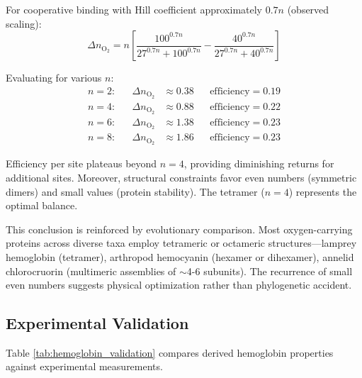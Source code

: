 \documentclass[10pt,twocolumn,a4paper]{article}
\theoremstyle{remark}
\begin{document}
For cooperative binding with Hill coefficient approximately $0.7n$ (observed scaling):
\begin{equation}
\Delta n_{\mathrm{O}_{2}} = n\left[\frac{100^{0.7n}}{27^{0.7n} + 100^{0.7n}} - \frac{40^{0.7n}}{27^{0.7n} + 40^{0.7n}}\right]
\end{equation}

Evaluating for various $n$:
\begin{align}
n = 2: &&\Delta n_{\mathrm{O}_{2}} &\approx 0.38 &&\text{efficiency} = 0.19 \\
n = 4: &&\Delta n_{\mathrm{O}_{2}} &\approx 0.88 &&\text{efficiency} = 0.22 \\
n = 6: &&\Delta n_{\mathrm{O}_{2}} &\approx 1.38 &&\text{efficiency} = 0.23 \\
n = 8: &&\Delta n_{\mathrm{O}_{2}} &\approx 1.86 &&\text{efficiency} = 0.23
\end{align}

Efficiency per site plateaus beyond $n = 4$, providing diminishing returns for additional sites. Moreover, structural constraints favor even numbers (symmetric dimers) and small values (protein stability). The tetramer ($n = 4$) represents the optimal balance.

This conclusion is reinforced by evolutionary comparison. Most oxygen-carrying proteins across diverse taxa employ tetrameric or octameric structures—lamprey hemoglobin (tetramer), arthropod hemocyanin (hexamer or dihexamer), annelid chlorocruorin (multimeric assemblies of $\sim$4-6 subunits). The recurrence of small even numbers suggests physical optimization rather than phylogenetic accident.

\subsection{Experimental Validation}

Table \ref{tab:hemoglobin_validation} compares derived hemoglobin properties against experimental measurements.
\end{document}
